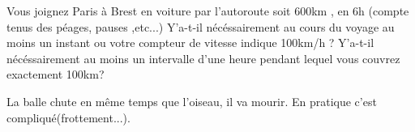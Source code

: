 \begin{Exercise}[title=Paris-Brest]
	Vous joignez Paris à Brest en voiture par l'autoroute soit 600km , en 6h (compte tenus des péages, pauses ,etc...)
	\Question Y'a-t-il nécéssairement au cours du voyage au moins un instant ou votre compteur de vitesse indique 100km/h ?
	\Question  Y'a-t-il nécéssairement au moins un intervalle d'une heure pendant lequel vous couvrez exactement 100km?
\end{Exercise}
\begin{Answer}
	\Question
	\Question La balle chute en même temps que l'oiseau, il va mourir. En pratique c'est compliqué(frottement...).
\end{Answer}
